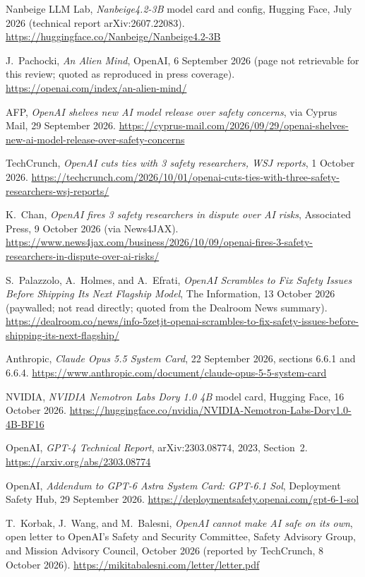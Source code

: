 \documentclass[11pt,letterpaper]{article}
\begin{document}
\begin{enumerate}[label={\textcolor{deepindigo}{[\arabic*]}}, leftmargin=2.6em, itemsep=0.3em]
  \item Nanbeige LLM Lab, \emph{Nanbeige4.2-3B} model card and config, Hugging Face, July 2026 (technical report arXiv:2607.22083). \url{https://huggingface.co/Nanbeige/Nanbeige4.2-3B}
  \item J.~Pachocki, \emph{An Alien Mind}, OpenAI, 6 September 2026 (page not retrievable for this review; quoted as reproduced in press coverage). \url{https://openai.com/index/an-alien-mind/}
  \item AFP, \emph{OpenAI shelves new AI model release over safety concerns}, via Cyprus Mail, 29 September 2026. \url{https://cyprus-mail.com/2026/09/29/openai-shelves-new-ai-model-release-over-safety-concerns}
  \item TechCrunch, \emph{OpenAI cuts ties with 3 safety researchers, WSJ reports}, 1 October 2026. \url{https://techcrunch.com/2026/10/01/openai-cuts-ties-with-three-safety-researchers-wsj-reports/}
  \item K.~Chan, \emph{OpenAI fires 3 safety researchers in dispute over AI risks}, Associated Press, 9 October 2026 (via News4JAX). \url{https://www.news4jax.com/business/2026/10/09/openai-fires-3-safety-researchers-in-dispute-over-ai-risks/}
  \item S.~Palazzolo, A.~Holmes, and A.~Efrati, \emph{OpenAI Scrambles to Fix Safety Issues Before Shipping Its Next Flagship Model}, The Information, 13 October 2026 (paywalled; not read directly; quoted from the Dealroom News summary). \url{https://dealroom.co/news/info-5zetjt-openai-scrambles-to-fix-safety-issues-before-shipping-its-next-flagship/}
  \item Anthropic, \emph{Claude Opus 5.5 System Card}, 22 September 2026, sections 6.6.1 and 6.6.4. \url{https://www.anthropic.com/document/claude-opus-5-5-system-card}
  \item NVIDIA, \emph{NVIDIA Nemotron Labs Dory 1.0 4B} model card, Hugging Face, 16 October 2026. \url{https://huggingface.co/nvidia/NVIDIA-Nemotron-Labs-Dory1.0-4B-BF16}
  \item OpenAI, \emph{GPT-4 Technical Report}, arXiv:2303.08774, 2023, Section~2. \url{https://arxiv.org/abs/2303.08774}
  \item OpenAI, \emph{Addendum to GPT-6 Astra System Card: GPT-6.1 Sol}, Deployment Safety Hub, 29 September 2026. \url{https://deploymentsafety.openai.com/gpt-6-1-sol}
  \item T.~Korbak, J.~Wang, and M.~Balesni, \emph{OpenAI cannot make AI safe on its own}, open letter to OpenAI's Safety and Security Committee, Safety Advisory Group, and Mission Advisory Council, October 2026 (reported by TechCrunch, 8 October 2026). \url{https://mikitabalesni.com/letter/letter.pdf}

\end{enumerate}
\end{document}
